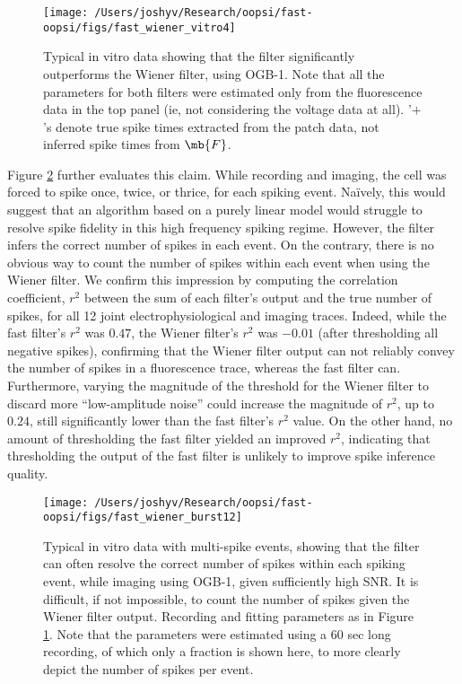 \begin{figure}[h!]
\centering \texttt{[image: /Users/joshyv/Research/oopsi/fast-oopsi/figs/fast\_wiener\_vitro4]}
\caption[\foopsi filter outperforms Wiener filter on biological data]{Typical in vitro data showing that the \foopsi filter significantly outperforms the Wiener filter, using OGB-1. Note that all the parameters for both filters were estimated only from the fluorescence data in the top panel (ie, not considering the voltage data at all).  '$+$'s denote true spike times extracted from the patch data, not inferred spike times from $\mb{F}$.} \label{fig:woopsi_data}
\end{figure}


Figure \ref{fig:woopsi_data_doublets} further evaluates this claim.  While recording and imaging, the cell was forced to spike once, twice, or thrice, for each spiking event.  Na\"{i}vely, this would suggest that an algorithm based on a purely linear model would struggle to resolve spike fidelity in this high frequency spiking regime.  However, the \foopsi filter infers the correct number of spikes in each event.  On the contrary, there is no obvious way to count the number of spikes within each event when using the Wiener filter. We confirm this impression by computing the correlation coefficient, $r^2$ between the sum of each filter's output and the true number of spikes, for all 12 joint electrophysiological and imaging traces.  Indeed, while the fast filter's $r^2$ was $0.47$, the Wiener filter's $r^2$ was $-0.01$ (after thresholding all negative spikes), confirming that the Wiener filter output can not reliably convey the number of spikes in a fluorescence trace, whereas the fast filter can.  Furthermore, varying the magnitude of the threshold for the Wiener filter to discard more ``low-amplitude noise'' could increase the magnitude of $r^2$, up to $0.24$, still significantly lower than the fast filter's $r^2$ value.  On the other hand, no amount of thresholding the fast filter yielded an improved $r^2$, indicating that thresholding the output of the fast filter is unlikely to improve spike inference quality.

\begin{figure}[h!]
\centering \texttt{[image: /Users/joshyv/Research/oopsi/fast-oopsi/figs/fast\_wiener\_burst12]}
\caption[\foopsi filter outperforms Wiener filter on multi-spike events]{Typical in vitro data with multi-spike events, showing that the \foopsi filter can often resolve the correct number of spikes within each spiking event, while imaging using OGB-1, given sufficiently high SNR.  It is difficult, if not impossible, to count the number of spikes given the Wiener filter output.  Recording and fitting parameters as in Figure \ref{fig:woopsi_data}. Note that the parameters were estimated using a 60 sec long recording, of which only a fraction is shown here, to more clearly depict the number of spikes per event.  } \label{fig:woopsi_data_doublets}
\end{figure}




